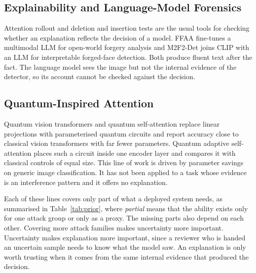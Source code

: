 \documentclass[conference]{IEEEtran}
\newcommand{\sub}[1]{\subsection{\texorpdfstring{\textbf{#1}}{#1}}}
\begin{document}
\sub{Explainability and Language-Model Forensics}
Attention rollout \cite{abnar2020rollout} and deletion and insertion tests
\cite{petsiuk2018rise} are the usual tools for checking whether an explanation
reflects the decision of a model. FFAA \cite{huang2024ffaa} fine-tunes a multimodal
LLM for open-world forgery analysis and M2F2-Det \cite{guo2025m2f2det} joins CLIP with
an LLM for interpretable forged-face detection. Both produce fluent text after the
fact. The language model sees the image but not the internal evidence of the
detector, so its account cannot be checked against the decision.

\sub{Quantum-Inspired Attention}
Quantum vision transformers \cite{cherrat2024qvt} and quantum self-attention
\cite{comajoan2024qgluon,evans2025on} replace linear projections with parameterised
quantum circuits and report accuracy close to classical vision transformers with far
fewer parameters. Quantum adaptive self-attention \cite{chen2025qasa} places such a
circuit inside one encoder layer and compares it with classical controls of equal
size. This line of work is driven by parameter savings on generic image
classification. It has not been applied to a task whose evidence is an interference
pattern and it offers no explanation.

Each of these lines covers only part of what a deployed system needs, as summarised in
Table~\ref{tab:prior}, where \emph{partial} means that the ability exists only for one
attack group or only as a proxy. The missing parts also depend on each other.
Covering more attack families makes uncertainty more important. Uncertainty makes
explanation more important, since a reviewer who is handed an uncertain sample needs
to know what the model saw. An explanation is only worth trusting when it comes from
the same internal evidence that produced the decision.
\end{document}
